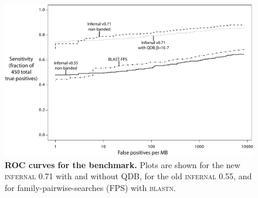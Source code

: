 \begin{figure}
\begin{center}
\includegraphics[width=6.4in,angle=0]{figs/roc}
\end{center}
\caption{\textbf{ROC curves for the benchmark.}  Plots are shown for
the new \textsc{infernal} 0.71 with and without QDB, for the old
\textsc{infernal} 0.55, and for family-pairwise-searches (FPS) with \textsc{blastn}.
}
\label{fig:roc}
\end{figure}
